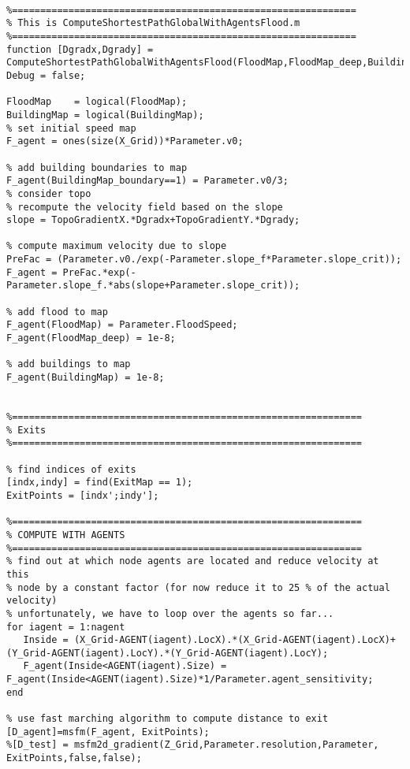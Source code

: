 
\lstset{basicstyle=\footnotesize\ttfamily}
    
    \begin{lstlisting}[breaklines]

%=============================================================
% This is ComputeShortestPathGlobalWithAgentsFlood.m
%=============================================================
function [Dgradx,Dgrady] = ComputeShortestPathGlobalWithAgentsFlood(FloodMap,FloodMap_deep,BuildingMap,BuildingMap_boundary,ExitMap,X_Grid,Y_Grid,D_orig,Dgradx,Dgrady,TopoGradientX,TopoGradientY,AGENT,nagent,Parameter)
Debug = false;

FloodMap    = logical(FloodMap);
BuildingMap = logical(BuildingMap);
% set initial speed map
F_agent = ones(size(X_Grid))*Parameter.v0;

% add building boundaries to map
F_agent(BuildingMap_boundary==1) = Parameter.v0/3;
% consider topo
% recompute the velocity field based on the slope
slope = TopoGradientX.*Dgradx+TopoGradientY.*Dgrady;

% compute maximum velocity due to slope
PreFac = (Parameter.v0./exp(-Parameter.slope_f*Parameter.slope_crit));
F_agent = PreFac.*exp(-Parameter.slope_f.*abs(slope+Parameter.slope_crit));

% add flood to map
F_agent(FloodMap) = Parameter.FloodSpeed;
F_agent(FloodMap_deep) = 1e-8;

% add buildings to map
F_agent(BuildingMap) = 1e-8;


%==============================================================
% Exits
%==============================================================

% find indices of exits
[indx,indy] = find(ExitMap == 1);
ExitPoints = [indx';indy'];

%==============================================================
% COMPUTE WITH AGENTS
%==============================================================
% find out at which node agents are located and reduce velocity at this
% node by a constant factor (for now reduce it to 25 % of the actual velocity)
% unfortunately, we have to loop over the agents so far...
for iagent = 1:nagent
   Inside = (X_Grid-AGENT(iagent).LocX).*(X_Grid-AGENT(iagent).LocX)+(Y_Grid-AGENT(iagent).LocY).*(Y_Grid-AGENT(iagent).LocY);
   F_agent(Inside<AGENT(iagent).Size) = F_agent(Inside<AGENT(iagent).Size)*1/Parameter.agent_sensitivity;
end

% use fast marching algorithm to compute distance to exit
[D_agent]=msfm(F_agent, ExitPoints);
%[D_test] = msfm2d_gradient(Z_Grid,Parameter.resolution,Parameter, ExitPoints,false,false);




\end{lstlisting}
